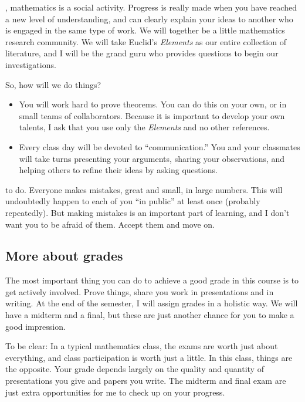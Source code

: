 \documentclass{tufte-handout}
\theoremstyle{definition}
\begin{document}
, mathematics is a social activity.
Progress is really made when you have reached a new level of understanding, and can clearly explain your ideas to another who is engaged in the same type of work.
We will together be a little mathematics research community.
We will take Euclid's \emph{Elements} as our entire collection of literature, and I will be the grand guru who provides questions to begin our investigations.

So, how will we do things?
\begin{itemize}
\item You will work hard to prove theorems.
You can do this on your own, or in small teams of collaborators.
Because it is important to develop your own talents, I ask that you use only the \emph{Elements} and no other references.

\item Every class day will be devoted to ``communication.''
You and your classmates will take turns presenting your arguments, sharing your observations, and helping others to refine their ideas by asking questions.
\end{itemize}



 to do.
Everyone makes mistakes, great and small, in large numbers.
This will undoubtedly happen to each of you ``in public'' at least once (probably repeatedly).
But making mistakes is an important part of learning, and I don't want you to be afraid of them.
Accept them and move on.

\subsection*{More about grades}
The most important thing you can do to achieve a good grade in this course is to get actively involved.
Prove things, share you work in presentations and in writing.
At the end of the semester, I will assign grades in a holistic way.
We will have a midterm and a final, but these are just another chance for you to make a good impression.

To be clear: In a typical mathematics class, the exams are worth just about everything, and class participation is worth just a little.
In this class, things are the opposite.
Your grade depends largely on the quality and quantity of presentations you give and papers you write.
The midterm and final exam are just extra opportunities for me to check up on your progress.
\end{document}
